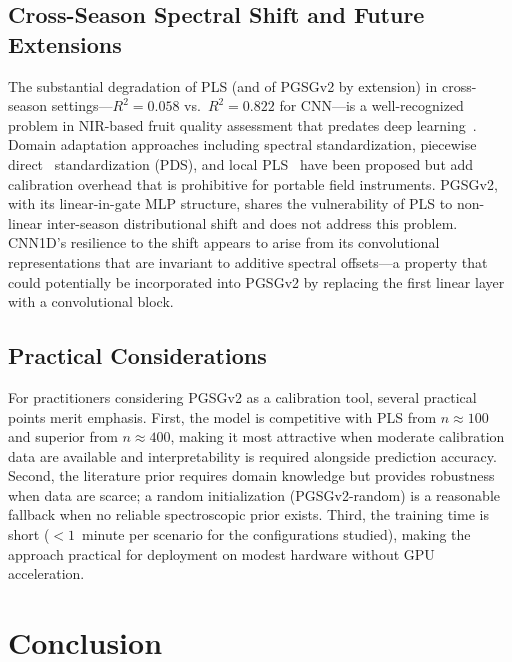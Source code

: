 \documentclass[preprint,12pt,hidelinks]{elsarticle}
\begin{document}
\subsection{Cross-Season Spectral Shift and Future Extensions}

The substantial degradation of PLS (and of PGSGv2 by extension) in
cross-season settings---$R^2 = 0.058$ vs.\ $R^2 = 0.822$ for CNN---is a
well-recognized problem in NIR-based fruit quality assessment that predates
deep learning~\cite{anderson2020,anderson2020b}. Domain adaptation
approaches including spectral standardization, piecewise direct~\cite{mishra2021transfer}
standardization (PDS), and local PLS~\cite{anderson2020b} have been proposed
but add calibration overhead that is prohibitive for portable field
instruments. PGSGv2, with its linear-in-gate MLP structure, shares the
vulnerability of PLS to non-linear inter-season distributional shift and
does not address this problem. CNN1D's resilience to the shift appears to
arise from its convolutional representations that are invariant to additive
spectral offsets---a property that could potentially be incorporated into
PGSGv2 by replacing the first linear layer with a convolutional block.

\subsection{Practical Considerations}

For practitioners considering PGSGv2 as a calibration tool, several
practical points merit emphasis. First, the model is competitive with PLS
from $n \approx 100$ and superior from $n \approx 400$, making it most
attractive when moderate calibration data are available and interpretability
is required alongside prediction accuracy. Second, the literature prior
requires domain knowledge but provides robustness when data are scarce; a
random initialization (PGSGv2-random) is a reasonable fallback when no
reliable spectroscopic prior exists. Third, the training time is short
($< 1$~minute per scenario for the configurations studied), making the
approach practical for deployment on modest hardware without GPU
acceleration.

\section{Conclusion}
\end{document}
